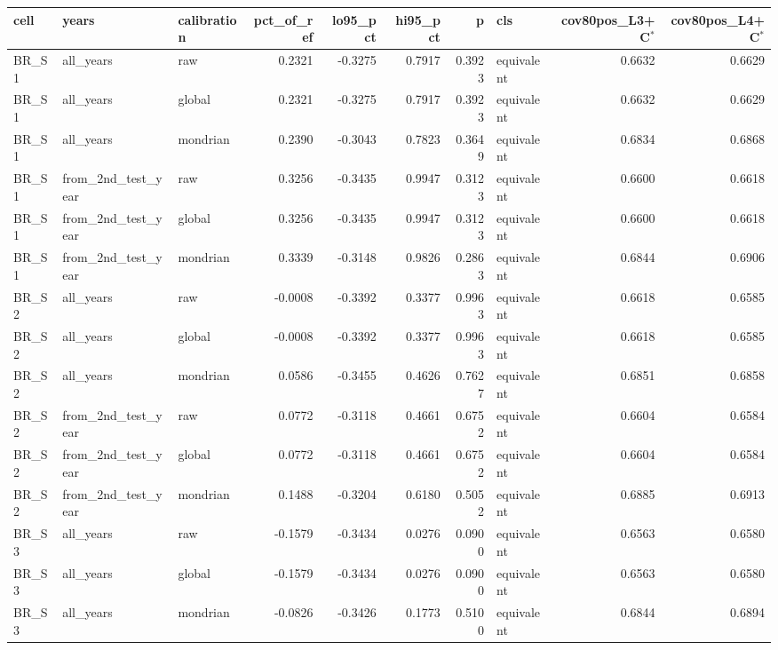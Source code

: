\begin{tabular}{lllrrrrlrr}
\toprule
cell & years & calibration & pct\_of\_ref & lo95\_pct & hi95\_pct & p & cls & cov80pos\_L3+C$^{*}$ & cov80pos\_L4+C$^{*}$ \\
\midrule
BR\_S1 & all\_years & raw & 0.2321 & -0.3275 & 0.7917 & 0.3923 & equivalent & 0.6632 & 0.6629 \\
BR\_S1 & all\_years & global & 0.2321 & -0.3275 & 0.7917 & 0.3923 & equivalent & 0.6632 & 0.6629 \\
BR\_S1 & all\_years & mondrian & 0.2390 & -0.3043 & 0.7823 & 0.3649 & equivalent & 0.6834 & 0.6868 \\
BR\_S1 & from\_2nd\_test\_year & raw & 0.3256 & -0.3435 & 0.9947 & 0.3123 & equivalent & 0.6600 & 0.6618 \\
BR\_S1 & from\_2nd\_test\_year & global & 0.3256 & -0.3435 & 0.9947 & 0.3123 & equivalent & 0.6600 & 0.6618 \\
BR\_S1 & from\_2nd\_test\_year & mondrian & 0.3339 & -0.3148 & 0.9826 & 0.2863 & equivalent & 0.6844 & 0.6906 \\
BR\_S2 & all\_years & raw & -0.0008 & -0.3392 & 0.3377 & 0.9963 & equivalent & 0.6618 & 0.6585 \\
BR\_S2 & all\_years & global & -0.0008 & -0.3392 & 0.3377 & 0.9963 & equivalent & 0.6618 & 0.6585 \\
BR\_S2 & all\_years & mondrian & 0.0586 & -0.3455 & 0.4626 & 0.7627 & equivalent & 0.6851 & 0.6858 \\
BR\_S2 & from\_2nd\_test\_year & raw & 0.0772 & -0.3118 & 0.4661 & 0.6752 & equivalent & 0.6604 & 0.6584 \\
BR\_S2 & from\_2nd\_test\_year & global & 0.0772 & -0.3118 & 0.4661 & 0.6752 & equivalent & 0.6604 & 0.6584 \\
BR\_S2 & from\_2nd\_test\_year & mondrian & 0.1488 & -0.3204 & 0.6180 & 0.5052 & equivalent & 0.6885 & 0.6913 \\
BR\_S3 & all\_years & raw & -0.1579 & -0.3434 & 0.0276 & 0.0900 & equivalent & 0.6563 & 0.6580 \\
BR\_S3 & all\_years & global & -0.1579 & -0.3434 & 0.0276 & 0.0900 & equivalent & 0.6563 & 0.6580 \\
BR\_S3 & all\_years & mondrian & -0.0826 & -0.3426 & 0.1773 & 0.5100 & equivalent & 0.6844 & 0.6894 \\

\end{tabular}
